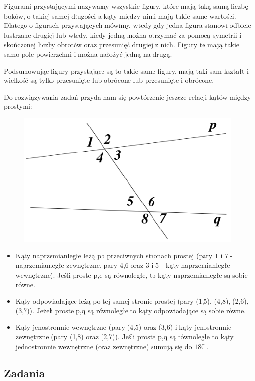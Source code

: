 \documentclass[11pt]{article}
\theoremstyle{definition}
\numberwithin{zad}{section}
\begin{document}
Figurami przystającymi nazywamy wszystkie figury, które mają taką samą liczbę boków, o takiej samej długości a kąty między nimi mają takie same wartości. Dlatego o figurach przystających mówimy, wtedy gdy jedna figura stanowi odbicie lustrzane drugiej lub wtedy, kiedy jedną można otrzymać za pomocą symetrii i skończonej liczby obrotów oraz przesunięć drugiej z nich. Figury te mają takie samo pole powierzchni i można nałożyć jedną na drugą.

Podsumowując figury przystające są to takie same figury, mają taki sam kształt i wielkość są tylko przesunięte lub obrócone lub przesunięte i obrócone.

Do rozwiązywania zadań przyda nam się powtórzenie jeszcze relacji kątów między prostymi:

\begin{figure}[h]
\centering
\includegraphics[width=0.5\linewidth]{474px-Katy_naprzemianlegle.png}
\end{figure}

\begin{itemize}
\item Kąty naprzemianległe leżą po przeciwnych stronach prostej (pary 1 i 7 - naprzemianległe zewnętrzne, pary 4,6 oraz 3 i 5 - kąty naprzemianległe wewnętrzne). Jeśli proste p,q są równoległe, to kąty naprzemianległe są sobie równe.
\item Kąty odpowiadające leżą po tej samej stronie prostej (pary (1,5), (4,8), (2,6), (3,7)). Jeżeli proste p,q są równoległe to kąty odpowiadające są sobie równe.
\item Kąty jenostronnie wewnętrzne (pary (4,5) oraz (3,6) i kąty jenostronnie zewnętrzne (pary (1,8) oraz (2,7)). Jeśli proste p,q są równoległe to kąty jednostronnie wewnętrzne (oraz zewnętrzne) sumują się do $180^\circ$.
\end{itemize}

\subsection{Zadania}
\end{document}
